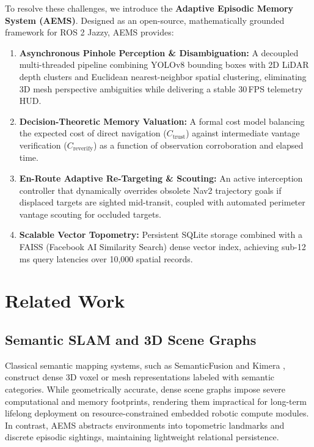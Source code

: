 \documentclass[conference]{IEEEtran}
\begin{document}
To resolve these challenges, we introduce the \textbf{Adaptive Episodic Memory System (AEMS)}. Designed as an open-source, mathematically grounded framework for ROS 2 Jazzy, AEMS provides:
\begin{enumerate}
    \item \textbf{Asynchronous Pinhole Perception \& Disambiguation:} A decoupled multi-threaded pipeline combining YOLOv8 bounding boxes with 2D LiDAR depth clusters and Euclidean nearest-neighbor spatial clustering, eliminating 3D mesh perspective ambiguities while delivering a stable 30\,FPS telemetry HUD.
    \item \textbf{Decision-Theoretic Memory Valuation:} A formal cost model balancing the expected cost of direct navigation ($C_{\text{trust}}$) against intermediate vantage verification ($C_{\text{reverify}}$) as a function of observation corroboration and elapsed time.
    \item \textbf{En-Route Adaptive Re-Targeting \& Scouting:} An active interception controller that dynamically overrides obsolete Nav2 trajectory goals if displaced targets are sighted mid-transit, coupled with automated perimeter vantage scouting for occluded targets.
    \item \textbf{Scalable Vector Topometry:} Persistent SQLite storage combined with a FAISS (Facebook AI Similarity Search) dense vector index, achieving sub-12\,ms query latencies over 10,000 spatial records.
\end{enumerate}

\section{Related Work}

\subsection{Semantic SLAM and 3D Scene Graphs}
Classical semantic mapping systems, such as SemanticFusion \cite{mccormac2017semanticfusion} and Kimera \cite{rosinol2020kimera}, construct dense 3D voxel or mesh representations labeled with semantic categories. While geometrically accurate, dense scene graphs impose severe computational and memory footprints, rendering them impractical for long-term lifelong deployment on resource-constrained embedded robotic compute modules. In contrast, AEMS abstracts environments into topometric landmarks and discrete episodic sightings, maintaining lightweight relational persistence.
\end{document}
